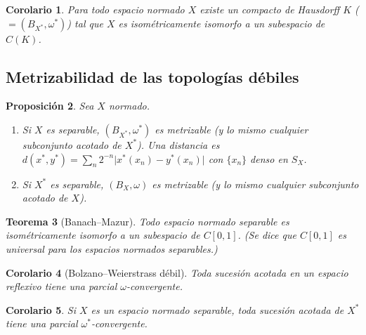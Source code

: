 \documentclass[11pt,a4paper]{article}
\newcommand{\abs}[1]{\lvert #1\rvert}
\newcommand{\BX}{B_X}
\newcommand{\SX}{S_X}
\theoremstyle{plain}
\newtheorem{teorema}{Teorema}[section]
\newtheorem{proposicion}[teorema]{Proposición}
\newtheorem{corolario}[teorema]{Corolario}
\theoremstyle{definition}
\theoremstyle{remark}
\begin{document}
\begin{corolario}
Para todo espacio normado $X$ existe un compacto de Hausdorff $K$ ($=(B_{X^*},\omega^*)$) tal que $X$ es isométricamente isomorfo a un subespacio de $C(K)$.
\end{corolario}

\subsection{Metrizabilidad de las topologías débiles}

\begin{proposicion}
Sea $X$ normado.
\begin{enumerate}[label=(\alph*)]
\item Si $X$ es separable, $(B_{X^*},\omega^*)$ es metrizable (y lo mismo cualquier subconjunto acotado de $X^*$). Una distancia es $d(x^*,y^*)=\sum_{n}2^{-n}\abs{x^*(x_n)-y^*(x_n)}$ con $\{x_n\}$ denso en $\SX$.
\item Si $X^*$ es separable, $(\BX,\omega)$ es metrizable (y lo mismo cualquier subconjunto acotado de $X$).
\end{enumerate}
\end{proposicion}

\begin{teorema}[Banach--Mazur]
Todo espacio normado separable es isométricamente isomorfo a un subespacio de $C[0,1]$. (Se dice que $C[0,1]$ es universal para los espacios normados separables.)
\end{teorema}

\begin{corolario}[Bolzano--Weierstrass débil]
Toda sucesión acotada en un espacio reflexivo tiene una parcial $\omega$-convergente.
\end{corolario}

\begin{corolario}
Si $X$ es un espacio normado separable, toda sucesión acotada de $X^*$ tiene una parcial $\omega^*$-convergente.
\end{corolario}
\end{document}
